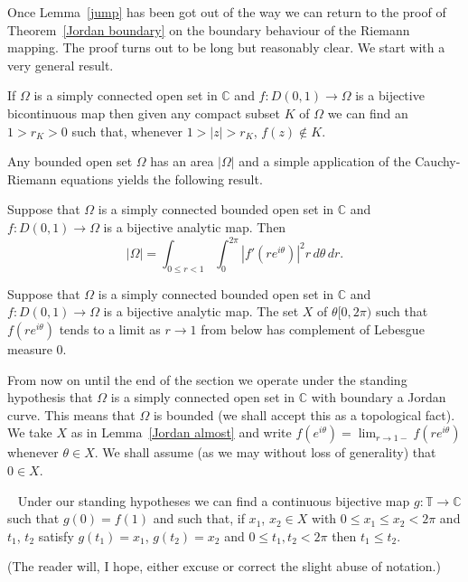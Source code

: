 Once Lemma~\ref{jump} has been got out of the way
we can return to the proof of Theorem~\ref{Jordan boundary}
on the boundary behaviour of the Riemann mapping.
The proof turns out to be long but reasonably clear.
We start with a very general result. 
\begin{lemma}
If $\Omega$ is a simply connected
open set in ${\mathbb C}$
and $f:D(0,1)\rightarrow \Omega$ is a bijective
bicontinuous map then given any compact subset $K$ of $\Omega$
we can find an $1>r_{K}>0$ such that, whenever
$1>|z|>r_{K}$, $f(z)\notin K$. 
\end{lemma}
Any bounded open set $\Omega$ has an area $|\Omega|$
and a simple application of the Cauchy-Riemann equations
yields the following result.
\begin{lemma}
Suppose that $\Omega$ is a simply connected bounded
open set in ${\mathbb C}$
and $f:D(0,1)\rightarrow \Omega$ is a bijective
analytic map. Then
\[|\Omega|=\int_{0\leq r<1}\int_{0}^{2\pi}
|f'(r e^{i\theta})|^{2}r\,d\theta\,dr.\]
\end{lemma}
\begin{lemma}\label{Jordan almost} 
Suppose that $\Omega$ is a simply connected bounded
open set in ${\mathbb C}$
and $f:D(0,1)\rightarrow \Omega$ is a bijective
analytic map. The set $X$
of $\theta [0,2\pi)$ such that $f(r e^{i\theta})$ tends
to a limit as $r\rightarrow 1$ from below
has complement of Lebesgue
measure $0$.
\end{lemma}

From now on until the end of the section we operate
under the standing hypothesis that
$\Omega$ is a simply connected
open set in ${\mathbb C}$ with boundary a Jordan curve.
This means that $\Omega$ is bounded (we shall accept
this as a topological fact). We take $X$ as 
in Lemma~\ref{Jordan almost} and write
$f(e^{i\theta})=\lim_{r\rightarrow 1-}f(r e^{i\theta})$
whenever $\theta\in X$. We shall assume
(as we may without loss of generality) that $0\in X$.
\begin{lemma}~\label{increasing Jordan}
Under our standing hypotheses we
can find a continuous bijective
map $g:{\mathbb T}\rightarrow{\mathbb C}$
such that $g(0)=f(1)$ and
such that, if $x_{1}$, $x_{2}\in X$ with
$0\leq x_{1}\leq x_{2} <2\pi$ and $t_{1}$, $t_{2}$
satisfy $g(t_{1})=x_{1}$, $g(t_{2})=x_{2}$
and $0\leq t_{1}, t_{2}<2\pi$ then $t_{1}\leq t_{2}$.
\end{lemma}
(The reader will, I hope, either excuse
or correct the slight abuse of notation.)


